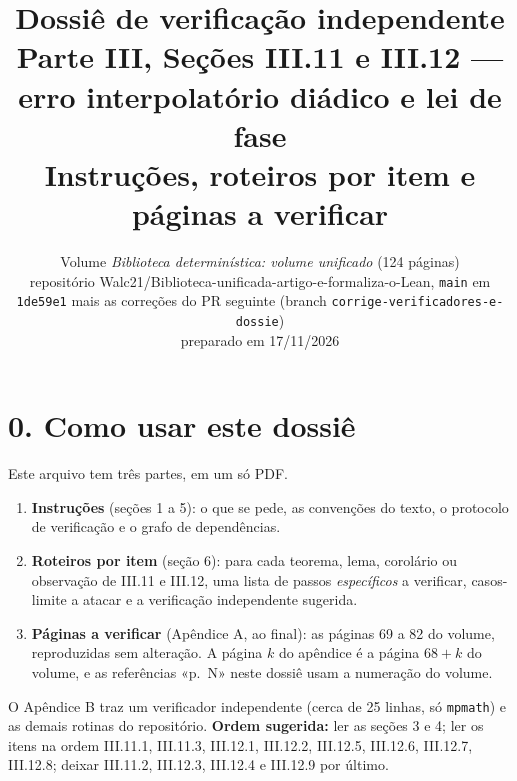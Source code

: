 \documentclass[11pt,a4paper]{article}
\title{\textbf{Dossiê de verificação independente}\\[2pt]
\large Parte III, Seções III.11 e III.12 — erro interpolatório diádico e lei de fase\\[2pt]
\normalsize Instruções, roteiros por item e páginas a verificar}
\author{}
\date{Volume \emph{Biblioteca determinística: volume unificado} (124 páginas)\\
repositório Walc21/Biblioteca-unificada-artigo-e-formaliza-o-Lean, \texttt{main} em \texttt{1de59e1} mais as correções do PR seguinte (branch \texttt{corrige-verificadores-e-dossie})\\
preparado em 17/11/2026}
\begin{document}
\maketitle
\thispagestyle{empty}

\section*{0.\; Como usar este dossiê}
Este arquivo tem três partes, em um só PDF.
\begin{enumerate}[leftmargin=1.6em]
\item \textbf{Instruções} (seções 1 a 5): o que se pede, as convenções do texto, o protocolo de verificação e o grafo de dependências.
\item \textbf{Roteiros por item} (seção 6): para cada teorema, lema, corolário ou observação de III.11 e III.12, uma lista de passos \emph{específicos} a verificar, casos-limite a atacar e a verificação independente sugerida.
\item \textbf{Páginas a verificar} (Apêndice A, ao final): as páginas 69 a 82 do volume, reproduzidas sem alteração. A página $k$ do apêndice é a página $68+k$ do volume, e as referências «p.~N» neste dossiê usam a numeração do volume.
\end{enumerate}
O Apêndice B traz um verificador independente (cerca de 25 linhas, só \texttt{mpmath}) e as demais rotinas do repositório.
\textbf{Ordem sugerida:} ler as seções 3 e 4; ler os itens na ordem III.11.1, III.11.3, III.12.1, III.12.2, III.12.5, III.12.6, III.12.7, III.12.8; deixar III.11.2, III.12.3, III.12.4 e III.12.9 por último.
\end{document}
